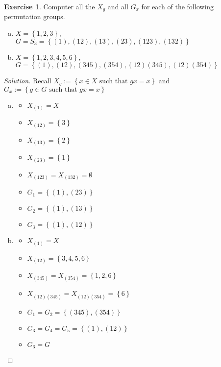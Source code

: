 \documentclass{article}
\theoremstyle{definition}
\newtheorem{theorem}{Exercise}[section]
\theoremstyle{plain}
\begin{document}
	\setcounter{section}{14}
	\setcounter{theorem}{1}
	\begin{theorem}
		Computer all the $X_g$ and all $G_x$ for each of the following permutation groups.
		\begin{enumerate}[(a)]
			\item $X = \left\{ 1,2,3 \right\}$,\\
			$G = S_3 = \left\{ (1), (12), (13), (23), (123), (132) \right\}$
			
			\item $X = \left\{ 1,2,3,4,5,6 \right\}$,\\
			$G = \left\{ (1), (12), (345), (354), (12)(345), (12)(354) \right\}$
		\end{enumerate}
	\end{theorem}
	\begin{proof}[Solution] Recall $X_g := \left\{ x \in X \text{ such that } gx = x \right\}$ and $G_x := \left\{ g \in G \text{ such that } gx = x \right\}$
		\begin{enumerate}[(a)]
			\item \begin{multicols}{4}
			\begin{itemize}
				\item $X_{(1)} = X$
				\item $X_{(12)} = \left\{ 3 \right\}$
				\item $X_{(13)} = \left\{ 2 \right\}$
				\item $X_{(23)} = \left\{ 1 \right\}$
				\item $X_{(123)} = X_{(132)} = \emptyset$
				\item $G_1 = \left\{ (1), (23) \right\}$
				\item $G_2 = \left\{ (1), (13) \right\}$
				\item $G_3 = \left\{ (1), (12) \right\}$
			\end{itemize}
			\end{multicols}
			\item \begin{multicols}{4}
			\begin{itemize}
				\item $X_{(1)} = X$
				\item $X_{(12)} = \left\{ 3, 4, 5, 6 \right\}$
				\item ${X_{(345)} = X_{(354)} = \left\{ 1, 2, 6 \right\}}$
				\item ${X_{(12)(345)} = X_{(12)(354)} = \left\{ 6 \right\}}$
				\item ${G_1 = G_2 = \left\{ (345), (354) \right\}}$
				\item ${G_3 = G_4 = G_5 = \left\{ (1), (12) \right\}}$
				\item $G_6 = G$ 
			\end{itemize}\qedhere
			\end{multicols}
		\end{enumerate}
	\end{proof}
	
\end{document}
